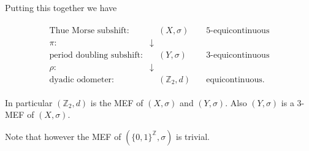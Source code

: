 \begin{frame}
	Putting this together we have
	\medskip
	
	\begin{align*}
		\begin{array}{rcc}
			\text{Thue Morse subshift:} &\quad (X, \sigma) \quad &5\text{-equicontinuous}\\
			\pi: &\downarrow &\\
			\text{period doubling subshift:} &\quad (Y, \sigma) \quad &3\text{-equicontinuous}\\
			\rho: &\downarrow &\\
			\text{dyadic odometer:} &\quad (\mathbb{Z}_2, d) \quad &\text{equicontinuous.}
		\end{array}
	\end{align*}\pause
	\medskip

	In particular $(\mathbb{Z}_2, d)$ is the MEF of $(X, \sigma)$ and $(Y, \sigma)$. Also $(Y, \sigma)$ is a $3$-MEF of $(X, \sigma)$.\pause
	
	Note that however the MEF of $(\{0, 1\}^\mathbb{Z}, \sigma)$ is trivial.
\end{frame}